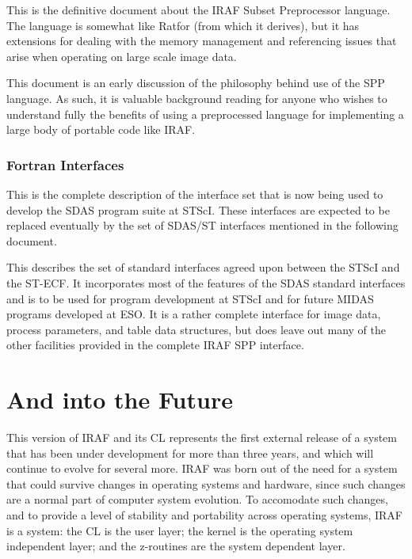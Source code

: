 \noindent
{}

This is the definitive document about the IRAF Subset Preprocessor
language.  The language is somewhat like Ratfor (from which
it derives), but it has extensions for dealing with the memory management
and referencing issues that arise when operating on large scale image data.

\noindent
{}

This document is an early discussion of the philosophy behind use of
the SPP language.  As such, it is valuable
background reading for anyone who wishes to understand fully the
benefits of using a preprocessed language for 
implementing a large body of portable
code like IRAF.

\subsubsection{Fortran Interfaces}

\noindent
{}

This is the complete description of the interface set that is now 
being used to develop the SDAS program suite at STScI.  These interfaces
are expected to be replaced eventually by the set of SDAS/ST 
interfaces mentioned in the following document.

\noindent
{}

This describes the set of standard interfaces agreed upon between 
the STScI and the ST-ECF.  It incorporates most of the features of the
SDAS standard interfaces and is to be used for program development 
at STScI and for future MIDAS programs developed at ESO.  It is
a rather complete interface for image data, process parameters,
and table data structures, but does leave out many of the other 
facilities provided in the complete IRAF SPP interface.

\newpage
\section{And into the Future}

This version of IRAF and its CL represents the first external release
of a system that has been under development for more than three years,
and which will continue to evolve for several
more.  IRAF was born out of the need for a system that
could survive changes in operating systems and hardware, since such
changes are a normal part of computer system evolution.  To 
accomodate such changes, and to provide a level of stability 
and portability across operating systems,
IRAF is a  system: the CL is the user layer;
the kernel is the operating system independent layer; and the
z-routines are the system dependent layer.  

